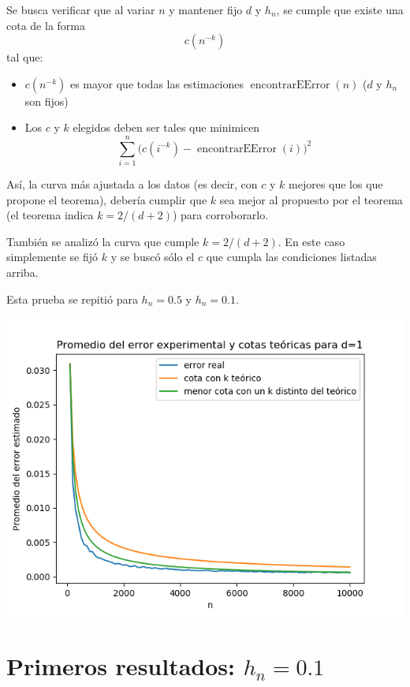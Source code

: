 \documentclass[12pt, a4paper]{article}
\begin{document}
Se busca verificar que al variar $n$ y mantener fijo $d$ y $h_n$, se cumple que existe una cota de la forma $$c(n^{-k})$$ tal que:
\begin{itemize}
  \item $c(n^{-k})$ es mayor que todas las estimaciones $\mathop{encontrarEError}(n)$ ($d$ y $h_n$ son fijos)
  \item Los $c$ y $k$ elegidos deben ser tales que minimicen $$\sum_{i=1}^n \big( c(i^{-k}) - \mathop{encontrarEError}(i) \big)^2$$
\end{itemize}
Así, la curva más ajustada a los datos (es decir, con $c$ y $k$ mejores que los que propone el teorema), debería cumplir que $k$ sea mejor al propuesto por el teorema (el teorema indica $k=2/(d+2)$) para corroborarlo.

También se analizó la curva que cumple $k=2/(d+2)$. En este caso simplemente se fijó $k$ y se buscó sólo el $c$ que cumpla las condiciones listadas arriba.

Esta prueba se repitió para $h_n=0.5$ y $h_n=0.1$.

\includegraphics[width=\textwidth]{figuras_h=0.1/cotas-error-d=1}

\section{Primeros resultados: $h_n=0.1$}
\end{document}
